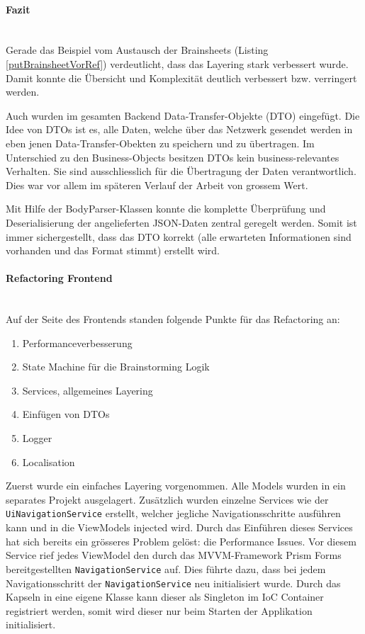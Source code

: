 \paragraph*{Fazit}~\\
Gerade das Beispiel vom Austausch der Brainsheets (Listing \ref{putBrainsheetVorRef}) verdeutlicht, dass das Layering stark verbessert wurde. Damit konnte die Übersicht und Komplexität deutlich verbessert bzw. verringert werden.

Auch wurden im gesamten Backend Data-Transfer-Objekte (DTO) \cite{DTO} eingefügt. Die Idee von DTOs ist es, alle Daten, welche über das Netzwerk gesendet werden in eben jenen Data-Transfer-Obekten zu speichern und zu übertragen. Im Unterschied zu den Business-Objects besitzen DTOs kein business-relevantes Verhalten. Sie sind ausschliesslich für die Übertragung der Daten verantwortlich. Dies war vor allem im späteren Verlauf der Arbeit von grossem Wert.

Mit Hilfe der BodyParser-Klassen konnte die komplette Überprüfung und Deserialisierung der angelieferten JSON-Daten zentral geregelt werden. Somit ist immer sichergestellt, dass das DTO korrekt (alle erwarteten Informationen sind vorhanden und das Format stimmt) erstellt wird. 

\paragraph*{Refactoring Frontend}~\\
Auf der Seite des Frontends standen folgende Punkte für das Refactoring an:
\begin{enumerate}
	\item Performanceverbesserung
	\item State Machine für die Brainstorming Logik
	\item Services, allgemeines Layering
	\item Einfügen von DTOs
	\item Logger
	\item Localisation
\end{enumerate}

Zuerst wurde ein einfaches Layering vorgenommen. Alle Models wurden in ein separates Projekt ausgelagert. Zusätzlich wurden einzelne Services wie der \texttt{UiNavigationService} erstellt, welcher jegliche Navigationsschritte ausführen kann und in die ViewModels injected wird. Durch das Einführen dieses Services hat sich bereits ein grösseres Problem gelöst: die Performance Issues. Vor diesem Service rief jedes ViewModel den durch das MVVM-Framework Prism Forms bereitgestellten \texttt{NavigationService} auf. Dies führte dazu, dass bei jedem Navigationsschritt der \texttt{NavigationService} neu initialisiert wurde. Durch das Kapseln in eine eigene Klasse kann dieser als Singleton im IoC Container registriert werden, somit wird dieser nur beim Starten der Applikation initialisiert. 

